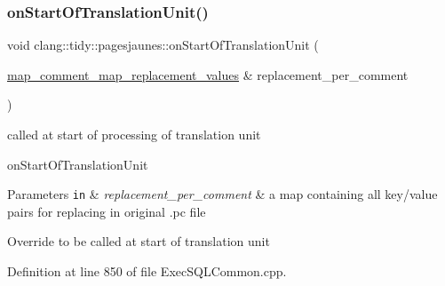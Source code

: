 \mbox{\label{namespaceclang_1_1tidy_1_1pagesjaunes_a02da712a4fa75552524d9f2e1964c270}} 
\subsubsection{\texorpdfstring{on\+Start\+Of\+Translation\+Unit()}{onStartOfTranslationUnit()}}
{\footnotesize\ttfamily void clang\+::tidy\+::pagesjaunes\+::on\+Start\+Of\+Translation\+Unit (\begin{DoxyParamCaption}\item[{\hyperlink{_exec_s_q_l_common_8h_a488fa487a3b35e0a4a38116ffab0a469}{map\+\_\+comment\+\_\+map\+\_\+replacement\+\_\+values} \&}]{replacement\+\_\+per\+\_\+comment }\end{DoxyParamCaption})}



called at start of processing of translation unit 

on\+Start\+Of\+Translation\+Unit


\begin{DoxyParams}[1]{Parameters}
\mbox{\tt in}  & {\em replacement\+\_\+per\+\_\+comment} & a map containing all key/value pairs for replacing in original .pc file\\
\hline
\end{DoxyParams}
Override to be called at start of translation unit 

Definition at line 850 of file Exec\+S\+Q\+L\+Common.\+cpp.

